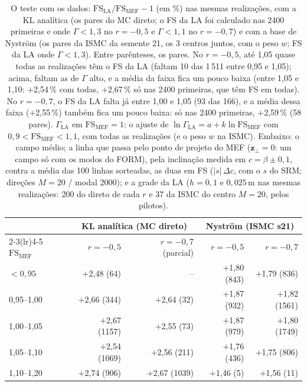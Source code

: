 \begin{table}[H]\centering\footnotesize\setlength{\tabcolsep}{4pt}
\caption{O teste com os dados: $\mathrm{FS}_\text{LA}/\mathrm{FS}_\text{MEF} - 1$ (em \%) nas mesmas realizações, com a KL analítica (os pares do MC direto; o FS da LA foi calculado nas 2400 primeiras e onde $\Gamma < 1{,}3$ no $r = -0{,}5$ e $\Gamma < 1{,}1$ no $r = -0{,}7$) e com a base de Nyström (os pares da ISMC da semente 21, os 3 centros juntos, com o peso $w$; FS da LA onde $\Gamma < 1{,}3$). Entre parênteses, os pares. No $r = -0{,}5$, até 1,05 quase todas as realizações têm o FS da LA (faltam 10 das 1\,511 entre 0,95 e 1,05); acima, faltam as de $\Gamma$ alto, e a média da faixa fica um pouco baixa (entre 1,05 e 1,10: $+$2,54\,\% com todas, $+$2,67\,\% só nas 2400 primeiras, que têm FS em todas). No $r = -0{,}7$, o FS da LA falta já entre 1,00 e 1,05 (93 das 166), e a média dessa faixa ($+$2,55\,\%) também fica um pouco baixa: só nas 2400 primeiras, $+$2,59\,\% (58 pares). $\Gamma_\text{LA}$ em $\mathrm{FS}_\text{MEF} = 1$: o ajuste de $\ln\Gamma_\text{LA} = a + k\ln\mathrm{FS}_\text{MEF}$ com $0{,}9 < \mathrm{FS}_\text{MEF} < 1{,}1$, com todas as realizações (e o peso $w$ na ISMC). Embaixo: o campo médio; a linha que passa pelo ponto de projeto do MEF ($\bm z_\perp = 0$: um campo só com os modos do FORM), pela inclinação medida em $c = \beta \pm 0{,}1$, contra a média das 100 linhas sorteadas, as duas em FS ($|s|\,\Delta c$, com o $s$ do SRM; direções $M = 20$ / modal 2000); e a grade da LA ($h = 0{,}1$ e $0{,}025$\,m nas mesmas realizações: 200 do direto de cada $r$ e 37 da ISMC do centro $M = 20$, pelos pilotos).}\label{tab:lateste}
\begin{tabular}{lrrrr}\toprule
 & \multicolumn{2}{c}{KL analítica (MC direto)} & \multicolumn{2}{c}{Nyström (ISMC s21)} \\\cmidrule(lr){2-3}\cmidrule(lr){4-5}
$\mathrm{FS}_\text{MEF}$ & $r = -0{,}5$ & $r = -0{,}7$ (parcial) & $r = -0{,}5$ & $r = -0{,}7$ \\\midrule
$< 0{,}95$ & $+$2,48 (64) & -- & $+$1,80 (843) & $+$1,79 (836) \\
0,95--1,00 & $+$2,66 (344) & $+$2,64 (32) & $+$1,87 (932) & $+$1,82 (1561) \\
1,00--1,05 & $+$2,67 (1157) & $+$2,55 (73) & $+$1,87 (979) & $+$1,80 (1749) \\
1,05--1,10 & $+$2,54 (1069) & $+$2,56 (211) & $+$1,76 (436) & $+$1,75 (806) \\
1,10--1,20 & $+$2,74 (906) & $+$2,67 (1039) & $+$1,46 (5) & $+$1,56 (11) \\

\end{tabular}
\end{table}
